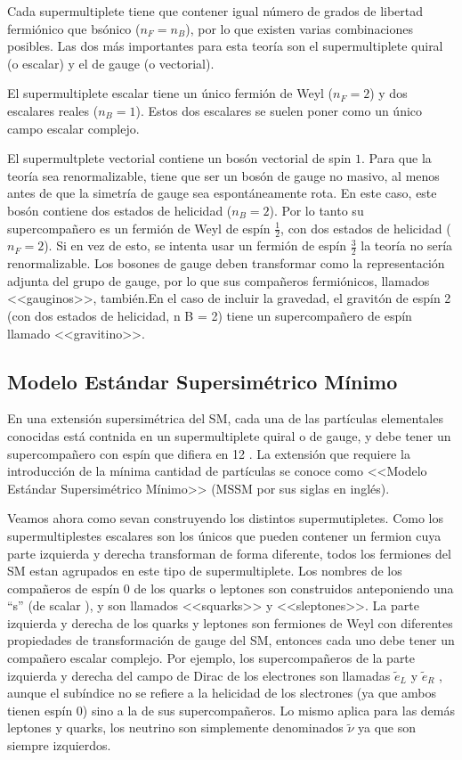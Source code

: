 Cada supermultiplete tiene que contener igual número de grados de libertad fermiónico que bsónico ($n_{F}=n_{B}$), por lo que existen varias combinaciones posibles. Las dos más importantes para esta teoría son el supermultiplete quiral (o escalar) y el de gauge (o vectorial).

El supermultiplete escalar tiene un único fermión de Weyl ($n_{F}=2$) y dos escalares reales ($n_{B}=1$). Estos dos escalares se suelen poner como un único campo escalar complejo.

El supermultplete vectorial contiene un bosón vectorial de spin $1$. Para que la teoría sea renormalizable, tiene que ser un bosón de gauge no masivo, al menos antes de que la simetría de gauge sea espontáneamente rota. En este caso, este bosón contiene dos estados de helicidad ($n_{B}=2$). Por lo tanto su supercompañero es un fermión de Weyl de espín $\frac{1}{2}$, con dos estados de helicidad ($n_{F}=2$). Si en vez de esto, se intenta usar un fermión de espín $\frac{3}{2}$ la teoría no sería renormalizable. Los bosones de gauge deben transformar como la representación adjunta del grupo de gauge, por lo que sus compañeros fermiónicos, llamados <<gauginos>>, también.En el caso de incluir la gravedad, el gravitón de espín 2 (con dos estados de helicidad, n B = 2) tiene un supercompañero de espín llamado <<gravitino>>.



\subsection{Modelo Estándar Supersimétrico Mínimo}

En una extensión supersimétrica del SM, cada una de las partículas elementales conocidas está contnida en un supermultiplete quiral o de gauge, y debe tener un supercompañero con espín que difiera en 12 . La extensión que requiere la introducción de la mínima cantidad de partículas se conoce como <<Modelo Estándar Supersimétrico Mínimo>> (MSSM por sus siglas en inglés).

Veamos ahora como sevan construyendo los distintos supermutipletes. Como los supermultiplestes escalares son los únicos que pueden contener un fermion cuya parte izquierda y derecha transforman de forma diferente, todos los fermiones del SM estan agrupados en este tipo de supermultiplete. Los nombres de los compañeros de espín 0 de los quarks o leptones son construidos anteponiendo una “s” (de scalar ), y son llamados <<squarks>> y <<sleptones>>. La parte izquierda y derecha de los quarks y leptones son fermiones de Weyl con diferentes propiedades de transformación de gauge del SM, entonces cada uno debe tener un compañero escalar complejo. Por ejemplo, los supercompañeros de la parte izquierda y derecha del campo de Dirac de los electrones son llamadas $\tilde{e}_{L}$ y $\tilde{e}_{R}$ , aunque el subíndice no se refiere a la helicidad de los slectrones (ya que ambos tienen espín 0) sino a la de sus supercompañeros. Lo mismo aplica para las demás leptones y quarks, los neutrino son simplemente denominados $\tilde{\nu}$ ya que son siempre izquierdos.

